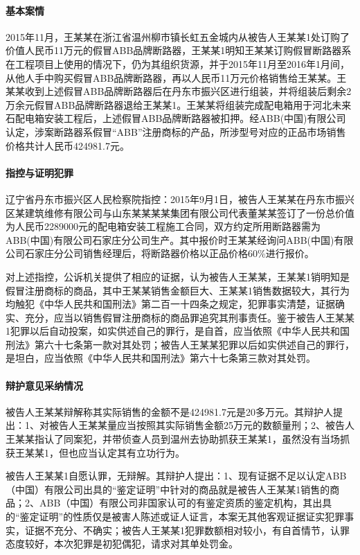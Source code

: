 \documentclass[
    a4paper
    ]{ctexart}
\begin{document}
{\begin{sloppy}
\paragraph{基本案情}

2015年11月，王某某在浙江省温州柳市镇长虹五金城内从被告人王某某1处订购了价值人民币11万元的假冒ABB品牌断路器，王某某1明知王某某订购假冒断路器系在工程项目上使用的情况下，仍为其组织货源，并于2015年11月至2016年1月间，从他人手中购买假冒ABB品牌断路器，再以人民币11万元价格销售给王某某。王某某收到上述假冒ABB品牌断路器后在丹东市振兴区进行组装，并将组装后剩余2万余元假冒ABB品牌断路器退给王某某1。王某某将组装完成配电箱用于河北未来石配电箱安装工程后，上述假冒ABB品牌断路器被扣押。经ABB(中国)有限公司认定，涉案断路器系假冒“ABB”注册商标的产品，所涉型号对应的正品市场销售价格共计人民币424981.7元。

\paragraph{指控与证明犯罪}

辽宁省丹东市振兴区人民检察院指控：2015年9月1日，被告人王某某在丹东市振兴区某建筑维修有限公司与山东某某某某集团有限公司代表董某某签订了一份总价值为人民币2289000元的配电箱安装工程施工合同，双方约定所用断路器需为ABB(中国)有限公司石家庄分公司生产。其中报价时王某某经询问ABB(中国)有限公司石家庄分公司销售经理后，将断路器价格以正品价格60\%进行报价。

对上述指控，公诉机关提供了相应的证据，认为被告人王某某，王某某1销明知是假冒注册商标的商品，其中王某某销售金额巨大、王某某1销售数据较大，其行为均触犯《中华人民共和国刑法》第二百一十四条之规定，犯罪事实清楚，证据确实、充分，应当以销售假冒注册商标的商品罪追究其刑事责任。鉴于被告人王某某1犯罪以后自动投案，如实供述自己的罪行，是自首，应当依照《中华人民共和国刑法》第六十七条第一款对其处罚；被告人王某某犯罪以后如实供述自己的罪行，是坦白，应当依照《中华人民共和国刑法》第六十七条第三款对其处罚。

\paragraph{辩护意见采纳情况}
被告人王某某辩解称其实际销售的金额不是424981.7元是20多万元。其辩护人提出：1、对被告人王某某量应当按照其实际销售金额25万元的数额量刑；2、被告人王某某指认了同案犯，并带侦查人员到温州去协助抓获王某某1，虽然没有当场抓获王某某1，但也应当认定其有立功行为。

被告人王某某1自愿认罪，无辩解。其辩护人提出：1、现有证据不足以认定ABB（中国）有限公司出具的“鉴定证明”中针对的商品就是被告人王某某1销售的商品；2、ABB（中国）有限公司非国家认可的有鉴定资质的鉴定机构，其出具的“鉴定证明”的性质仅是被害人陈述或证人证言，本案无其他客观证据证实犯罪事实，证据不充分、不确实；被告人王某某1犯罪数额相对较小，有自首情节，认罪态度较好，本次犯罪是初犯偶犯，请求对其单处罚金。


\end{sloppy}}
\end{document}
